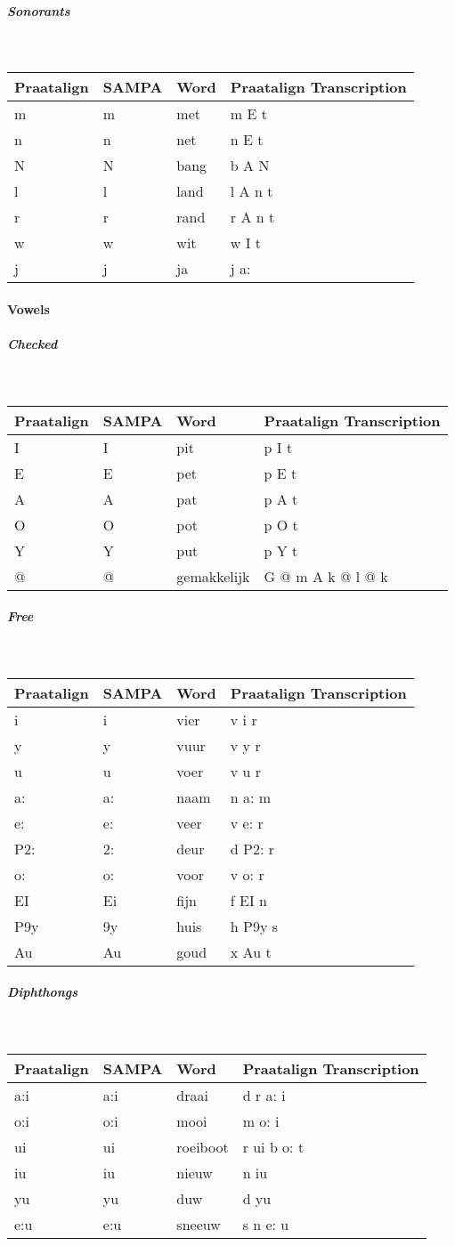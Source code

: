 \subparagraph{Sonorants}\strut\\
\begin{tabular}{llll}
	Praatalign & SAMPA & Word & Praatalign Transcription\\
	\hline
	m & m & met & m E t\\
	n & n & net & n E t\\
	N & N & bang & b A N\\
	l & l & land & l A n t\\
	r & r & rand & r A n t\\
	w & w & wit & w I t\\
	j & j & ja & j a:
\end{tabular}

\paragraph{Vowels}
\subparagraph{Checked}\strut\\
\begin{tabular}{llll}
	Praatalign & SAMPA & Word & Praatalign Transcription\\
	\hline
	I & I & pit & p I t\\
	E & E & pet & p E t\\
	A & A & pat & p A t\\
	O & O & pot & p O t\\
	Y & Y & put & p Y t\\
	@ & @ & gemakkelijk & G @ m A k @ l @ k
\end{tabular}

\subparagraph{Free}\strut\\
\begin{tabular}{llll}
	Praatalign & SAMPA & Word & Praatalign Transcription\\
	\hline
	i & i & vier & v i r\\
	y & y & vuur & v y r\\
	u & u & voer & v u r\\
	a: & a: & naam & n a: m\\
	e: & e: & veer & v e: r\\
	P2: & 2: & deur & d P2: r\\
	o: & o: & voor & v o: r\\
	EI & Ei & fijn & f EI n\\
	P9y & 9y & huis & h P9y s\\
	Au & Au & goud & x Au t
\end{tabular}

\subparagraph{Diphthongs}\strut\\
\begin{tabular}{llll}
	Praatalign & SAMPA & Word & Praatalign Transcription\\
	\hline
	a:i & a:i & draai & d r a: i\\
	o:i & o:i & mooi & m o: i\\
	ui & ui & roeiboot & r ui b o: t\\
	iu & iu & nieuw & n iu\\
	yu & yu & duw & d yu\\
	e:u & e:u & sneeuw & s n e: u
\end{tabular}

